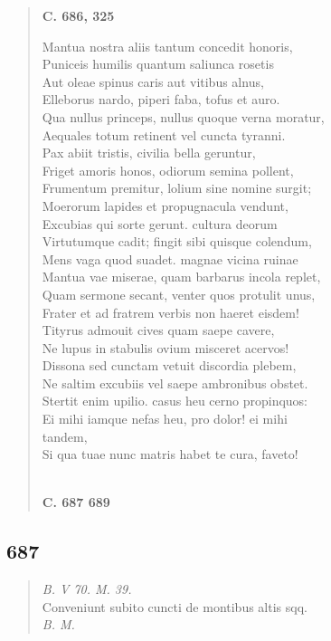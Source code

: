 \documentclass[11pt, a4paper]{report}
\begin{document}
\begin{verse}
     \marginpar{[160]} \begin{center} \textbf{C. 686, 325} \end{center}Mantua nostra aliis tantum concedit honoris, \\ Puniceis humilis quantum saliunca rosetis \\ Aut oleae spinus caris aut vitibus alnus, \\ Elleborus nardo, piperi faba, tofus et auro. \\ Qua nullus princeps, nullus quoque verna moratur, \\ Aequales totum retinent vel cuncta tyranni. \\ Pax abiit tristis, civilia bella geruntur, \\ Friget amoris honos, odiorum semina pollent, \\ Frumentum premitur, lolium sine nomine surgit; \\ Moerorum lapides et propugnacula vendunt, \\ Excubias qui sorte gerunt. cultura deorum \\ Virtutumque cadit; fingit sibi quisque colendum, \\ Mens vaga quod suadet. magnae vicina ruinae \\ Mantua vae miserae, quam barbarus incola replet, \\ Quam sermone secant, venter quos protulit unus, \\ Frater et ad fratrem verbis non haeret eisdem! \\ Tityrus admouit cives quam saepe cavere, \\ Ne lupus in stabulis ovium misceret acervos! \\ Dissona sed cunctam vetuit discordia plebem, \\ Ne saltim excubiis vel saepe ambronibus obstet. \\ Stertit enim upilio. casus heu cerno propinquos: \\ Ei mihi iamque nefas heu, pro dolor! ei mihi \\ tandem, \\ Si qua tuae nunc matris habet te cura, faveto! \\ 
        ﻿\pagebreak 
    \begin{center} \textbf{C. 687 689} \end{center} \marginpar{[161]} 
      \end{verse}
  
            \subsection*{687}
      \begin{verse}
      \textit{B. V 70. M. 39.} \\ Conveniunt subito cuncti de montibus altis sqq. \\ \textit{B. M.} \\ 
      \end{verse}
  
\end{document}
